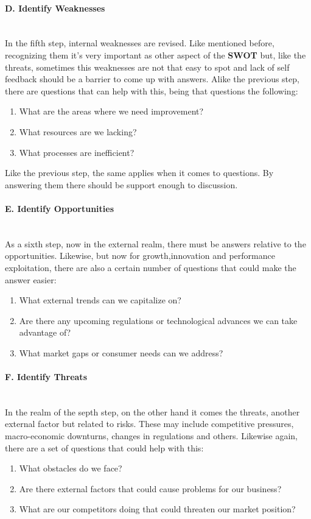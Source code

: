 \paragraph{D. Identify Weaknesses}\mbox{}\\
In the fifth step, internal weaknesses are revised. Like mentioned before, recognizing them it's very important as other aspect of the \textbf{SWOT} but, like the threats, sometimes this weaknesses are not that easy to spot and lack of self feedback should be a barrier to come up with answers. Alike the previous step, there are questions that can help with this, being that questions the following:
\begin{enumerate}
    \item What are the areas where we need improvement?
    \item What resources are we lacking?
    \item What processes are inefficient?
\end{enumerate}
Like the previous step, the same applies when it comes to questions. By answering them there should be support enough to discussion.

\paragraph{E. Identify Opportunities}\mbox{}\\
As a sixth step, now in the external realm, there must be answers relative to the opportunities. Likewise, but now for growth,innovation and performance exploitation, there are also a certain number of questions that could make the answer easier:
\begin{enumerate}
    \item What external trends can we capitalize on?
    \item Are there any upcoming regulations or technological advances we can take advantage of?
    \item What market gaps or consumer needs can we address?
\end{enumerate}

\paragraph{F. Identify Threats}\mbox{}\\
In the realm of the septh step, on the other hand it comes the threats, another external factor but related to risks. These may include competitive pressures, macro-economic downturns, changes in regulations and others. Likewise again, there are a set of questions that could help with this:
\begin{enumerate}
    \item What obstacles do we face?
    \item Are there external factors that could cause problems for our business?
    \item What are our competitors doing that could threaten our market position?
\end{enumerate}

